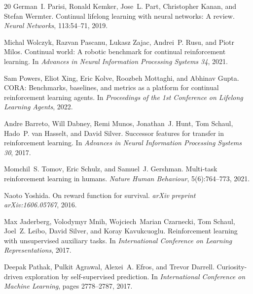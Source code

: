 \documentclass{article}
\begin{document}
\begin{thebibliography}{20}
German~I. Parisi, Ronald Kemker, Jose~L. Part, Christopher Kanan, and Stefan
  Wermter.
\newblock Continual lifelong learning with neural networks: A review.
\newblock \emph{Neural Networks}, 113:54--71, 2019.

Michal Wolczyk, Razvan Pascanu, Lukasz Zajac, Andrei~P. Rusu, and Piotr Milos.
\newblock Continual world: A robotic benchmark for continual reinforcement
  learning.
\newblock In \emph{Advances in Neural Information Processing Systems 34}, 2021.

Sam Powers, Eliot Xing, Eric Kolve, Roozbeh Mottaghi, and Abhinav Gupta.
\newblock CORA: Benchmarks, baselines, and metrics as a platform for continual
  reinforcement learning agents.
\newblock In \emph{Proceedings of the 1st Conference on Lifelong Learning
  Agents}, 2022.

Andre Barreto, Will Dabney, Remi Munos, Jonathan~J. Hunt, Tom Schaul, Hado~P.
  van Hasselt, and David Silver.
\newblock Successor features for transfer in reinforcement learning.
\newblock In \emph{Advances in Neural Information Processing Systems 30}, 2017.

Momchil~S. Tomov, Eric Schulz, and Samuel~J. Gershman.
\newblock Multi-task reinforcement learning in humans.
\newblock \emph{Nature Human Behaviour}, 5(6):764--773, 2021.

Naoto Yoshida.
\newblock On reward function for survival.
\newblock \emph{arXiv preprint arXiv:1606.05767}, 2016.

Max Jaderberg, Volodymyr Mnih, Wojciech~Marian Czarnecki, Tom Schaul, Joel~Z.
  Leibo, David Silver, and Koray Kavukcuoglu.
\newblock Reinforcement learning with unsupervised auxiliary tasks.
\newblock In \emph{International Conference on Learning Representations}, 2017.

Deepak Pathak, Pulkit Agrawal, Alexei~A. Efros, and Trevor Darrell.
\newblock Curiosity-driven exploration by self-supervised prediction.
\newblock In \emph{International Conference on Machine Learning}, pages
  2778--2787, 2017.

\end{thebibliography}
\end{document}
